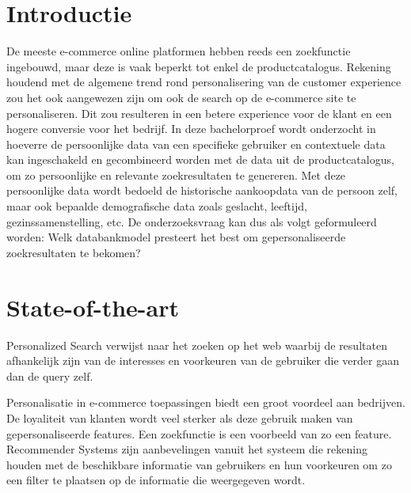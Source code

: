 
\section{Introductie} %
\label{sec:introductie}

De meeste e-commerce online platformen hebben reeds een zoekfunctie ingebouwd, maar deze is vaak beperkt tot enkel de productcatalogus. Rekening houdend met de algemene trend rond personalisering van de customer experience zou het ook aangewezen zijn om ook de search op de e-commerce site te personaliseren. Dit zou resulteren in een betere experience voor de klant en een hogere conversie voor het bedrijf. In deze bachelorproef wordt onderzocht in hoeverre de persoonlijke data van een specifieke gebruiker en contextuele data kan ingeschakeld en gecombineerd worden met de data uit de productcatalogus, om zo persoonlijke en relevante zoekresultaten te genereren. 
Met deze persoonlijke data wordt bedoeld de historische aankoopdata van de persoon zelf, maar ook bepaalde demografische data zoals geslacht, leeftijd, gezinssamenstelling, etc. De onderzoeksvraag kan dus als volgt geformuleerd worden: Welk databankmodel presteert het best om gepersonaliseerde zoekresultaten te bekomen?



\section{State-of-the-art}
\label{sec:state-of-the-art}

Personalized Search \autocite{Pitkow2002} verwijst naar het zoeken op het web waarbij de resultaten afhankelijk zijn van de interesses en voorkeuren van de gebruiker die verder gaan dan de query zelf. 

Personalisatie in e-commerce toepassingen biedt een groot voordeel aan bedrijven. De loyaliteit van klanten wordt veel sterker als deze gebruik maken van gepersonaliseerde features.\autocite{Telang2005} Een zoekfunctie is een voorbeeld van zo een feature.
Recommender Systems \autocite{Resnick1997} zijn aanbevelingen vanuit het systeem die rekening houden met de beschikbare informatie van gebruikers en hun voorkeuren om zo een filter te plaatsen op de informatie die weergegeven wordt. 

